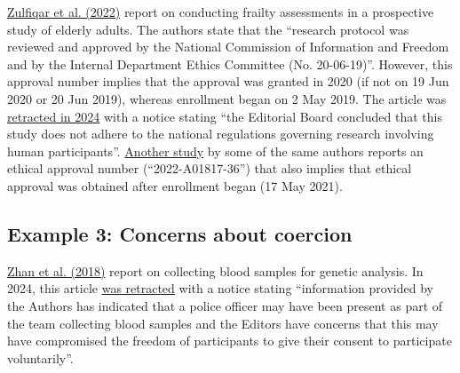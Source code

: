 \documentclass[letterpaper, 12pt]{article}
\begin{document}
\href{https://doi.org/10.3390/medicines9070038}{Zulfiqar et al. (2022)} report on conducting frailty assessments in a prospective study of elderly adults. The authors state that the ``research protocol was reviewed and approved by the National Commission of Information and Freedom and by the Internal Department Ethics Committee (No. 20-06-19)''. However, this approval number implies that the approval was granted in 2020 (if not on 19 Jun 2020 or 20 Jun 2019), whereas enrollment began on 2 May 2019. The article was \href{https://doi.org/10.3390/medicines11080022}{retracted in 2024} with a notice stating ``the Editorial Board concluded that this study does not adhere to the national regulations governing research involving human participants''. \href{https://doi.org/10.3390/medicines9110058}{Another study} by some of the same authors reports an ethical approval number (``2022-A01817-36'') that also implies that ethical approval was obtained after enrollment began (17 May 2021).

\subsection*{Example 3: Concerns about coercion}

\href{https://doi.org/10.1038/s41598-018-22975-6}{Zhan et al. (2018)} report on collecting blood samples for genetic analysis. In 2024, this article \href{https://doi.org/10.1038/s41598-024-64860-5}{was retracted} with a notice stating ``information provided by the Authors has indicated that a police officer may have been present as part of the team collecting blood samples and the Editors have concerns that this may have compromised the freedom of participants to give their consent to participate voluntarily''.
\end{document}
